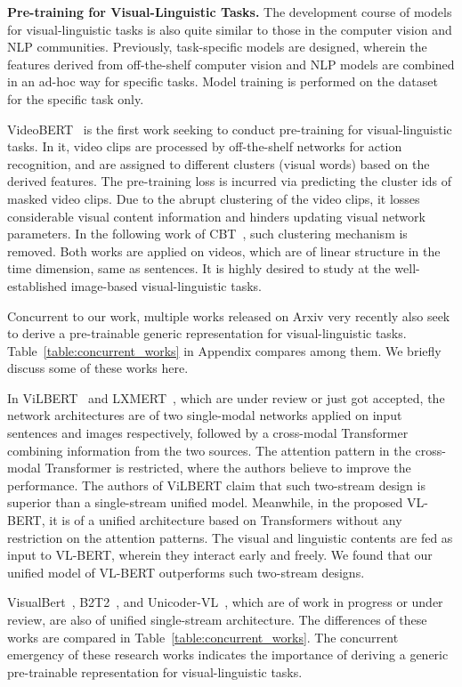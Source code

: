 \textbf{Pre-training for Visual-Linguistic Tasks.} The development course of models for visual-linguistic tasks is also quite similar to those in the computer vision and NLP communities. Previously, task-specific models are designed, wherein the features derived from off-the-shelf computer vision and NLP models are combined in an ad-hoc way for specific tasks. Model training is performed on the dataset for the specific task only. 

VideoBERT~\citep{sun2019videobert} is the first work seeking to conduct pre-training for visual-linguistic tasks. In it, video clips are processed by off-the-shelf networks for action recognition, and are assigned to different clusters (visual words) based on the derived features. The pre-training loss is incurred via predicting the cluster ids of masked video clips. Due to the abrupt clustering of the video clips, it losses considerable visual content information and hinders updating visual network parameters. In the following work of CBT~\citep{sun2019contrastive}, such clustering mechanism is removed. Both works are applied on videos, which are of linear structure in the time dimension, same as sentences. It is highly desired to study at the well-established image-based visual-linguistic tasks.

Concurrent to our work, multiple works released on Arxiv very recently also seek to derive a pre-trainable generic representation for visual-linguistic tasks. Table~\ref{table:concurrent_works} in Appendix compares among them. We briefly discuss some of these works here. 

In ViLBERT~\citep{lu2019vilbert} and LXMERT~\citep{tan2019lxmert}, which are under review or just got accepted, the network architectures are of two single-modal networks applied on input sentences and images respectively, followed by a cross-modal Transformer combining information from the two sources. The attention pattern in the cross-modal Transformer is restricted, where the authors believe to improve the performance. The authors of ViLBERT claim that such two-stream design is superior than a single-stream unified model. Meanwhile, in the proposed VL-BERT, it is of a unified architecture based on Transformers without any restriction on the attention patterns. The visual and linguistic contents are fed as input to VL-BERT, wherein they interact early and freely. We found that our unified model of VL-BERT outperforms such two-stream designs. 

VisualBert~\citep{li2019visualbert}, B2T2~\citep{alberti2019fusion}, and Unicoder-VL~\citep{li2019unicodervl}, which are of work in progress or under review, are also of unified single-stream architecture. The differences of these works are compared in Table~\ref{table:concurrent_works}. The concurrent emergency of these research works indicates the importance of deriving a generic pre-trainable representation for visual-linguistic tasks.

